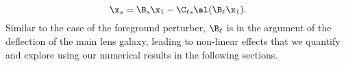 \begin{equation}
\x_s = \B_s \x_1 - \C_{\ell s} \al(\B_\ell \x_1).
\end{equation}
Similar to the case of the foreground perturber, $\B_\ell$ is in the argument of the deflection of the main lens galaxy, leading to non-linear effects that we quantify and explore using our numerical results in the following sections.
